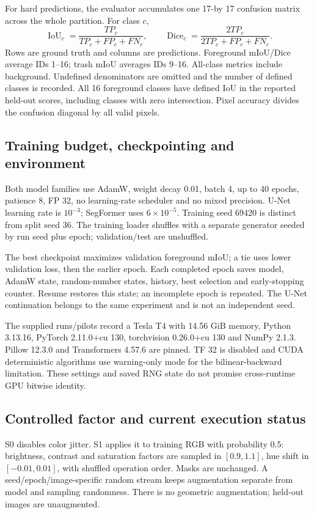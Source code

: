 \documentclass[oneside,final,a4 paper]{hcmut-report}
\begin{document}
For hard predictions, the evaluator accumulates one 17-by 17 confusion matrix across the whole partition. For class $c$,
\begin{equation}
\operatorname{IoU}_c=\frac{TP_c}{TP_c+FP_c+FN_c},\qquad
\operatorname{Dice}_c=\frac{2TP_c}{2TP_c+FP_c+FN_c}.
\end{equation}
Rows are ground truth and columns are predictions. Foreground mIoU/Dice average IDs 1--16; trash mIoU averages IDs 9--16. All-class metrics include background. Undefined denominators are omitted and the number of defined classes is recorded. All 16 foreground classes have defined IoU in the reported held-out scores, including classes with zero intersection. Pixel accuracy divides the confusion diagonal by all valid pixels.

\subsection{Training budget, checkpointing and environment}
Both model families use AdamW, weight decay 0.01, batch 4, up to 40 epochs, patience 8, FP 32, no learning-rate scheduler and no mixed precision. U-Net learning rate is $10^{-3}$; SegFormer uses $6\times 10^{-5}$. Training seed 69420 is distinct from split seed 36. The training loader shuffles with a separate generator seeded by run seed plus epoch; validation/test are unshuffled.

The best checkpoint maximizes validation foreground mIoU; a tie uses lower validation loss, then the earlier epoch. Each completed epoch saves model, AdamW state, random-number states, history, best selection and early-stopping counter. Resume restores this state; an incomplete epoch is repeated. The U-Net continuation belongs to the same experiment and is not an independent seed.

The supplied runs/pilots record a Tesla T4 with 14.56 GiB memory, Python 3.13.16, PyTorch 2.11.0+cu 130, torchvision 0.26.0+cu 130 and NumPy 2.1.3. Pillow 12.3.0 and Transformers 4.57.6 are pinned. TF 32 is disabled and CUDA deterministic algorithms use warning-only mode for the bilinear-backward limitation. These settings and saved RNG state do not promise cross-runtime GPU bitwise identity.

\subsection{Controlled factor and current execution status}
S0 disables color jitter. S1 applies it to training RGB with probability 0.5: brightness, contrast and saturation factors are sampled in $[0.9,1.1]$, hue shift in $[-0.01,0.01]$, with shuffled operation order. Masks are unchanged. A seed/epoch/image-specific random stream keeps augmentation separate from model and sampling randomness. There is no geometric augmentation; held-out images are unaugmented.
\end{document}
